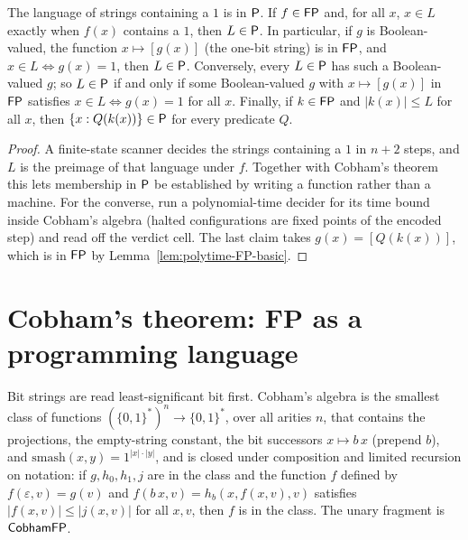 \begin{lemma}
  \label{lem:polytime-decision-fn}
  \leanok
  The language of strings containing a $1$ is in $\mathsf{P}$. If $f \in \mathsf{FP}$
  and, for all $x$, $x \in L$ exactly when $f(x)$ contains a $1$, then
  $L \in \mathsf{P}$. In particular, if $g$ is Boolean-valued, the function
  $x \mapsto [g(x)]$ (the one-bit string) is in $\mathsf{FP}$, and
  $x \in L \iff g(x) = 1$, then $L \in \mathsf{P}$. Conversely, every
  $L \in \mathsf{P}$ has such a Boolean-valued $g$; so $L \in \mathsf{P}$ if and only
  if some Boolean-valued $g$ with $x \mapsto [g(x)]$ in $\mathsf{FP}$ satisfies
  $x \in L \iff g(x) = 1$ for all $x$. Finally, if $k \in \mathsf{FP}$ and
  $|k(x)| \le L$ for all $x$, then $\{x : Q(k(x))\} \in \mathsf{P}$ for every
  predicate $Q$.
\end{lemma}
\begin{proof}
  \leanok
  A finite-state scanner decides the strings containing a $1$ in $n + 2$
  steps, and $L$ is the preimage of that language under $f$. Together with
  Cobham's theorem this lets membership in $\mathsf{P}$ be established by writing
  a function rather than a machine. For the converse, run a polynomial-time
  decider for its time bound inside Cobham's algebra (halted configurations
  are fixed points of the encoded step) and read off the verdict cell. The
  last claim takes $g(x) = [Q(k(x))]$, which is in $\mathsf{FP}$ by
  Lemma~\ref{lem:polytime-FP-basic}.
\end{proof}

\section{Cobham's theorem: FP as a programming language}

\begin{definition}
  \label{def:polytime-cobham}
  \leanok
  Bit strings are read least-significant bit first. Cobham's algebra is the
  smallest class of functions $(\{0,1\}^*)^n \to \{0,1\}^*$, over all arities
  $n$, that contains the projections, the empty-string constant, the bit
  successors $x \mapsto b\,x$ (prepend $b$), and
  $\mathrm{smash}(x, y) = 1^{|x| \cdot |y|}$, and is closed under composition
  and limited recursion on notation: if $g, h_0, h_1, j$ are in the class and
  the function $f$ defined by $f(\varepsilon, v) = g(v)$ and
  $f(b\,x, v) = h_b(x, f(x, v), v)$ satisfies $|f(x, v)| \le |j(x, v)|$ for
  all $x, v$, then $f$ is in the class. The
  unary fragment is $\mathsf{CobhamFP}$.
\end{definition}

